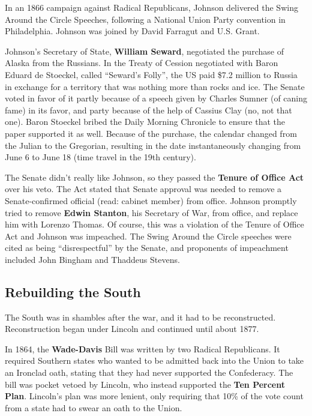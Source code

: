 In an 1866 campaign against Radical Republicans,
Johnson delivered the Swing Around the Circle Speeches,
following a National Union Party convention in Philadelphia.
Johnson was joined by David Farragut and U.S. Grant.

Johnson's Secretary of State, \textbf{William Seward}, negotiated the purchase of Alaska from the Russians.
In the Treaty of Cession negotiated with Baron Eduard de Stoeckel, called ``Seward's Folly'',
the US paid \$7.2 million to Russia in exchange for a territory that was nothing more than rocks and ice.
The Senate voted in favor of it
partly because of a speech given by Charles Sumner (of caning fame) in its favor,
and party because of the help of Cassius Clay (no, not that one).
Baron Stoeckel bribed the Daily Morning Chronicle to ensure that the paper supported it as well.
Because of the purchase, the calendar changed from the Julian to the Gregorian,
resulting in the date instantaneously changing from June 6 to June 18 (time travel in the 19th century).

The Senate didn't really like Johnson, so they passed the \textbf{Tenure of Office Act} over his veto.
The Act stated that Senate approval was needed to remove a Senate-confirmed official (read: cabinet member) from office.
Johnson promptly tried to remove \textbf{Edwin Stanton}, his Secretary of War, from office,
and replace him with Lorenzo Thomas.
Of course, this was a violation of the Tenure of Office Act and Johnson was impeached.
The Swing Around the Circle speeches were cited as being ``disrespectful'' by the Senate,
and proponents of impeachment included John Bingham and Thaddeus Stevens.

\subsection*{Rebuilding the South}

The South was in shambles after the war, and it had to be reconstructed.
Reconstruction began under Lincoln and continued until about 1877.

In 1864, the \textbf{Wade-Davis} Bill was written by two Radical Republicans.
It required Southern states who wanted to be admitted back into the Union to take an Ironclad oath,
stating that they had never supported the Confederacy.
The bill was pocket vetoed by Lincoln, who instead supported the \textbf{Ten Percent Plan}.
Lincoln's plan was more lenient,
only requiring that 10\% of the vote count from a state had to swear an oath to the Union.

